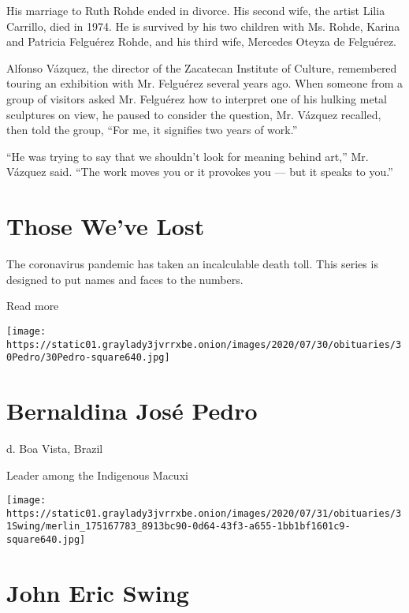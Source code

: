 His marriage to Ruth Rohde ended in divorce. His second wife, the artist
Lilia Carrillo, died in 1974. He is survived by his two children with
Ms. Rohde, Karina and Patricia Felguérez Rohde, and his third wife,
Mercedes Oteyza de Felguérez.

Alfonso Vázquez, the director of the Zacatecan Institute of Culture,
remembered touring an exhibition with Mr. Felguérez several years ago.
When someone from a group of visitors asked Mr. Felguérez how to
interpret one of his hulking metal sculptures on view, he paused to
consider the question, Mr. Vázquez recalled, then told the group, ``For
me, it signifies two years of work.''

``He was trying to say that we shouldn't look for meaning behind art,''
Mr. Vázquez said. ``The work moves you or it provokes you --- but it
speaks to you.''

\href{https://www.nytimes3xbfgragh.onion/interactive/2020/obituaries/people-died-coronavirus-obituaries.html?action=click\&pgtype=Article\&state=default\&region=BELOW_MAIN_CONTENT\&context=covid_obits_promo}{}

\hypertarget{those-weve-lost}{%
\section{Those We've Lost}\label{those-weve-lost}}

The coronavirus pandemic has taken an incalculable death toll. This
series is designed to put names and faces to the numbers.

Read more

\texttt{[image: https://static01.graylady3jvrrxbe.onion/images/2020/07/30/obituaries/30Pedro/30Pedro-square640.jpg]}

\hypertarget{bernaldina-josuxe9-pedro}{%
\section{Bernaldina José Pedro}\label{bernaldina-josuxe9-pedro}}

d. Boa Vista, Brazil

Leader among the Indigenous Macuxi

\texttt{[image: https://static01.graylady3jvrrxbe.onion/images/2020/07/31/obituaries/31Swing/merlin\_175167783\_8913bc90-0d64-43f3-a655-1bb1bf1601c9-square640.jpg]}

\hypertarget{john-eric-swing}{%
\section{John Eric Swing}\label{john-eric-swing}}

